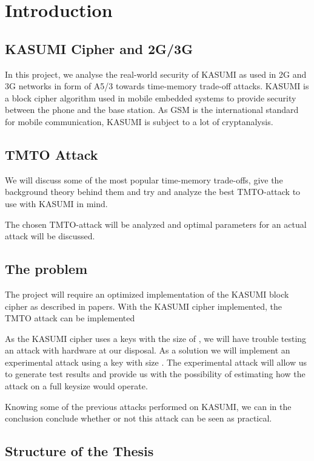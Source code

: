 \chapter{Introduction}

\section{KASUMI Cipher and 2G/3G}

In this project, we analyse the real-world security of KASUMI as used
in 2G and 3G networks in form of A5/3 towards time-memory trade-off
attacks. KASUMI is a block cipher algorithm used in mobile embedded
systems to provide security between the phone and the base station. As
GSM is the international standard for mobile communication, KASUMI
is subject to a lot of cryptanalysis.

\section{TMTO Attack}

We will discuss some of the most popular time-memory trade-offs, give
the background theory behind them and try and analyze the best
TMTO-attack to use with KASUMI in mind.

The chosen TMTO-attack will be analyzed and optimal parameters for an
actual attack will be discussed.


\section{The problem}

The project will require an optimized implementation of the KASUMI
block cipher as described in papers. With the KASUMI cipher
implemented, the TMTO attack can be implemented

As the KASUMI cipher uses a keys with the size of , we
will have trouble testing an attack with hardware at our disposal. As
a solution we will implement an experimental attack using a key with
size . The experimental attack will allow us to generate
test results and provide us with the possibility of estimating how the
attack on a full keysize would operate.

Knowing some of the previous attacks performed on KASUMI, we can in
the conclusion conclude whether or not this attack can be seen as practical.

\section{Structure of the Thesis}

